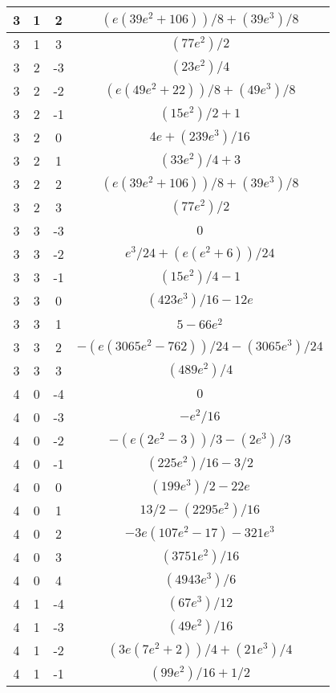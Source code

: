 \begin{table}
\begin{tabular}{|c|c|c|c|}
\hline
3  &  1  &  2  &  $(e (39 e^2 + 106))/8 + (39 e^3)/8$  \\
\hline
3  &  1  &  3  &  $(77 e^2)/2$  \\
\hline
3  &  2  &  -3  &  $(23 e^2)/4$  \\
\hline
3  &  2  &  -2  &  $(e (49 e^2 + 22))/8 + (49 e^3)/8$  \\
\hline
3  &  2  &  -1  &  $(15 e^2)/2 + 1$  \\
\hline
3  &  2  &  0  &  $4 e + (239 e^3)/16$  \\
\hline
3  &  2  &  1  &  $(33 e^2)/4 + 3$  \\
\hline
3  &  2  &  2  &  $(e (39 e^2 + 106))/8 + (39 e^3)/8$  \\
\hline
3  &  2  &  3  &  $(77 e^2)/2$  \\
\hline
3  &  3  &  -3  &  $0$  \\
\hline
3  &  3  &  -2  &  $e^3/24 + (e (e^2 + 6))/24$  \\
\hline
3  &  3  &  -1  &  $(15 e^2)/4 - 1$  \\
\hline
3  &  3  &  0  &  $(423 e^3)/16 - 12 e$  \\
\hline
3  &  3  &  1  &  $5 - 66 e^2$  \\
\hline
3  &  3  &  2  &  $- (e (3065 e^2 - 762))/24 - (3065 e^3)/24$  \\
\hline
3  &  3  &  3  &  $(489 e^2)/4$  \\
\hline
4  &  0  &  -4  &  $0$  \\
\hline
4  &  0  &  -3  &  $-e^2/16$  \\
\hline
4  &  0  &  -2  &  $- (e (2 e^2 - 3))/3 - (2 e^3)/3$  \\
\hline
4  &  0  &  -1  &  $(225 e^2)/16 - 3/2$  \\
\hline
4  &  0  &  0  &  $(199 e^3)/2 - 22 e$  \\
\hline
4  &  0  &  1  &  $13/2 - (2295 e^2)/16$  \\
\hline
4  &  0  &  2  &  $- 3 e (107 e^2 - 17) - 321 e^3$  \\
\hline
4  &  0  &  3  &  $(3751 e^2)/16$  \\
\hline
4  &  0  &  4  &  $(4943 e^3)/6$  \\
\hline
4  &  1  &  -4  &  $(67 e^3)/12$  \\
\hline
4  &  1  &  -3  &  $(49 e^2)/16$  \\
\hline
4  &  1  &  -2  &  $(3 e (7 e^2 + 2))/4 + (21 e^3)/4$  \\
\hline
4  &  1  &  -1  &  $(99 e^2)/16 + 1/2$  \\

\end{tabular}
\end{table}
